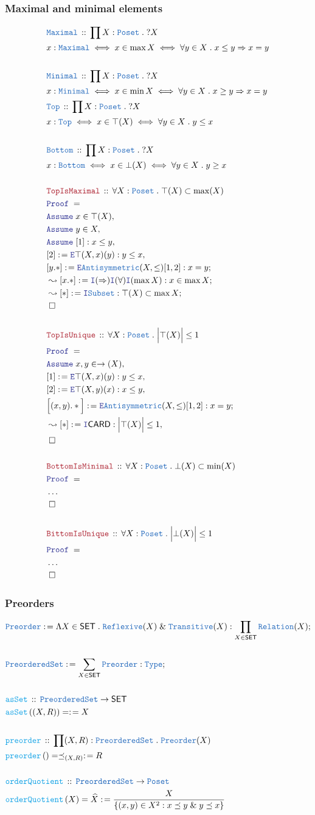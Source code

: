 \documentclass[12pt]{scrartcl}
\newcommand{\TYPE}[1]{\textcolor{NavyBlue}{\mathtt{#1}}}
\newcommand{\FUNC}[1]{\textcolor{Cerulean}{\mathtt{#1}}}
\newcommand{\LOGIC}[1]{\textcolor{Blue}{\mathtt{#1}}}
\newcommand{\THM}[1]{\textcolor{Maroon}{\mathtt{#1}}}
\renewcommand{\.}{\; . \;}
\newcommand{\de}{: \kern 0.1pc =}
\newcommand{\Act}[1]{\left( #1 \right)}
\newcommand{\Theorem}[2]{& \THM{#1} \, :: \, #2 \\ & \Proof = \\ }
\newcommand{\DeclareType}[2]{& \TYPE{#1} \, :: \, #2 \\}
\newcommand{\DefineNamedType}[4]{& #1 : \TYPE{#2} \iff #3 \iff #4 \\}
\newcommand{\DeclareFunc}[2]{& \FUNC{#1} \, :: \, #2 \\}
\newcommand{\DefineNamedFunc}[4]{&  \FUNC{#1}\Act{#2} = #3 \de #4 \\}
\newcommand{\Page}[1]{ \begin{align*} #1 \end{align*}   }
\newcommand{\NoProof}{ & \ldots \\ \EndProof}
\renewcommand{\And}{\; \& \;}
\newcommand{\Imply}{\Rightarrow}
\newcommand{\Intro}{\LOGIC{I}}
\newcommand{\Elim}{\LOGIC{E}}
\newcommand{\Type}{\TYPE{Type}}
\newcommand{\Say}[3]{& #1 \de #2 : #3, \\}
\newcommand{\Conclude}[3]{& #1 \de #2 : #3; \\}
\newcommand{\Derive}[3]{& \leadsto #1 \de #2 : #3, \\}
\newcommand{\DeriveConclude}[3]{& \leadsto #1 \de #2 : #3 ; \\}
\newcommand{\Assume}[2]{& \LOGIC{Assume} \; #1 : #2, \\}
\newcommand{\AssumeIn}[2]{& \LOGIC{Assume} \; #1 \in #2, \\}
\newcommand{\QED}{\; \square}
\newcommand{\EndProof}{& \QED \\}
\newcommand{\Proof}{\LOGIC{Proof} \; }
\newcommand{\SET}{\mathsf{SET}}
\newcommand{\Poset}{\TYPE{Poset}}
\newcommand{\Pres}{\TYPE{PreorderedSet}}
\begin{document}
\subsubsection{Maximal and minimal elements}
\Page{
	\DeclareType{Maximal}{\prod X : \Poset \. ?X  }
	\DefineNamedType{x}{Maximal}{x \in \max X}{\forall y \in X \. x \le y \Imply x = y}
	\\
	\DeclareType{Minimal}{\prod X : \Poset \. ?X  }
	\DefineNamedType{x}{Minimal}{x \in \min X}{\forall y \in X \. x \ge y \Imply x = y}
	\DeclareType{Top}{\prod X : \Poset \. ?X}
	\DefineNamedType{x}{Top}{x \in \top(X)}{\forall y \in X \. y \le x} 
	\\
	\DeclareType{Bottom}{\prod X : \Poset \. ?X}
	\DefineNamedType{x}{Bottom}{x \in \bot(X)}{\forall y \in X \. y \ge x} 
	\\
	\Theorem{TopIsMaximal}{\forall X : \Poset \. \top(X) \subset \max(X)}
	\AssumeIn{x}{\top(X)}
	\AssumeIn{y}{X}
	\Assume{[1]}{x \le y}
	\Say{[2]}{\Elim \top(X,x)(y)}{y \le x}
	\Conclude{[y.*]}{\Elim \TYPE{Antisymmetric}(X,\le)[1,2]}{x = y}
	\DeriveConclude{[x.*]}{\Intro(\Imply)\Intro(\forall)\Intro(\max X)}{x \in \max X }
	\DeriveConclude{[*]}{\Intro \TYPE{Subset}}{\top(X) \subset \max X}
	\EndProof
	\\
	\Theorem{TopIsUnique}{\forall X : \Poset \. \Big|\top(X)\Big| \le 1}
	\AssumeIn{x,y}{\to(X)}
	\Say{[1]}{\Elim \top(X,x)(y)}{y \le x}
	\Say{[2]}{\Elim \top(X,y)(x)}{x \le y}
	\Conclude{\Big[(x,y).*\Big]}{\Elim \TYPE{Antisymmetric}(X,\le)[1,2]}{x = y}
	\Derive{[*]}{\Intro \mathsf{CARD}}{ \Big|\top(X)\Big| \le 1  }
	\EndProof
	\\
	\Theorem{BottomIsMinimal}{\forall X : \Poset \. \bot(X) \subset \min(X)}
	\NoProof
	\\
	\Theorem{BittomIsUnique}{\forall X : \Poset \. \Big|\bot(X)\Big| \le 1}
	\NoProof
}
\subsubsection{Preorders}
\Page{
	\Conclude{\TYPE{Preorder}}{
		\Lambda X \in \SET \. 
		\TYPE{Reflexive}(X) \And \TYPE{Transitive}(X)}
	{\prod_{X \in \SET} \TYPE{Relation}(X)} 
	\\
	\Conclude{\Pres}{ \sum_{X \in \SET} \TYPE{Preorder}}{ \Type }	
	\\
	\DeclareFunc{asSet}{\Pres \to \SET}
	\DefineNamedFunc{asSet}{(X,R)}{}{X}
	\\
	\DeclareFunc{preorder}{\prod (X,R) : \Pres \. \TYPE{Preorder}(X)}
	\DefineNamedFunc{preorder}{}{\preceq_{(X,R)}}{R}
	\\
	\DeclareFunc{orderQuotient}{\Pres \to \Poset}
	\DefineNamedFunc{orderQuotient}{X}{\widehat{X}}{\frac{X}{\{ (x,y) \in X^2 :  x \preceq y \And y \preceq x  \}}}
}
\newpage
\end{document}
